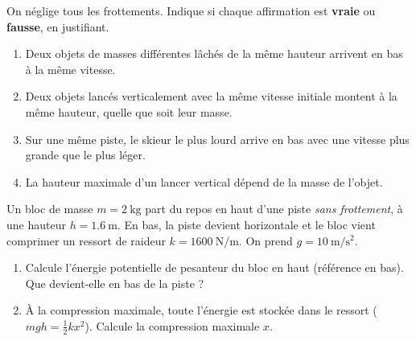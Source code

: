 \documentclass[11pt,a4paper]{article}
\begin{document}
\begin{exo}
On néglige tous les frottements. Indique si chaque affirmation est \textbf{vraie} ou \textbf{fausse},
en justifiant.
\begin{enumerate}[label=\alph*)]
  \item Deux objets de masses différentes lâchés de la même hauteur arrivent en bas à la même vitesse.
  \item Deux objets lancés verticalement avec la même vitesse initiale montent à la même hauteur,
        quelle que soit leur masse.
  \item Sur une même piste, le skieur le plus lourd arrive en bas avec une vitesse plus grande que le
        plus léger.
  \item La hauteur maximale d'un lancer vertical dépend de la masse de l'objet.
\end{enumerate}
\end{exo}

\begin{exo}
Un bloc de masse $m=\qty{2}{\kilogram}$ part du repos en haut d'une piste \emph{sans frottement}, à une
hauteur $h=\qty{1,6}{\metre}$. En bas, la piste devient horizontale et le bloc vient comprimer un
ressort de raideur $k=\qty{1600}{\newton\per\metre}$. On prend $g=\qty{10}{\metre\per\second\squared}$.
\begin{center}
\end{center}
\begin{enumerate}[label=\alph*)]
  \item Calcule l'énergie potentielle de pesanteur du bloc en haut (référence en bas). Que devient-elle
        en bas de la piste ?
  \item À la compression maximale, toute l'énergie est stockée dans le ressort ($mgh=\tfrac12 k x^2$).
        Calcule la compression maximale $x$.
\end{enumerate}
\end{exo}
\end{document}
